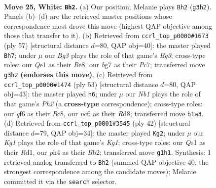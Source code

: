 \documentclass[11pt]{article}
\begin{document}
\clearpage

\begin{figure}[p]\centering
\begin{subfigure}{0.46\textwidth}\centering
\resizebox{\linewidth}{!}{%
\newchessgame
\chessboard[
  setfen={2r3k1/pp3pb1/1nn2qp1/3p4/3P3p/1B4BP/PP3PP1/RN2Q1K1 w - - 0 25},
  showmover=false,
  pgfstyle=straightmove, color=movearrow, markmove={g3-h2}
]}
\caption{}
\end{subfigure}\hfill
\begin{subfigure}{0.46\textwidth}\centering
\resizebox{\linewidth}{!}{%
\newchessgame
\chessboard[
  setfen={4r2k/2pq1pp1/2nb2bp/1p5P/3P4/1B3NN1/1P3PP1/2QR2K1 b - - 0 29},
  showmover=false,
  pgfstyle=straightmove, color=movearrow, markmove={g6-h7}
]}
\caption{}
\end{subfigure}
\\[4pt]
\begin{subfigure}{0.46\textwidth}\centering
\resizebox{\linewidth}{!}{%
\newchessgame
\chessboard[
  setfen={2br2k1/3nbppp/1q2p3/ppN5/3P3P/P3QNP1/1P3P2/2R2BK1 b - - 0 27},
  showmover=false,
  pgfstyle=straightmove, color=movearrow, markmove={h7-h6}
]}
\caption{}
\end{subfigure}\hfill
\begin{subfigure}{0.46\textwidth}\centering
\resizebox{\linewidth}{!}{%
\newchessgame
\chessboard[
  setfen={2r3k1/1p2qpp1/p1n1pnp1/8/2B3P1/bP2PN1P/PB2QP2/3R2K1 w - - 1 22},
  showmover=false,
  pgfstyle=straightmove, color=movearrow, markmove={g1-g2}
]}
\caption{}
\end{subfigure}
\caption{\textbf{Move 25, White: \texttt{Bh2}.} (a) Our position; Melanie plays \texttt{Bh2} (\texttt{g3h2}). Panels (b)--(d) are the retrieved master positions whose correspondence most drove this move (highest QAP objective among those that transfer to it). (b) Retrieved from \texttt{ccrl\_top\_p0000\#1673} (ply 57) [structural distance $d$=80, QAP obj=40]: the master played \texttt{Bh7}; under $\mu$ our \emph{Bg3} plays the role of that game's \emph{Bg3}; cross-type roles: our \emph{Q}e1 as their \emph{R}e8, our \emph{b}g7 as their \emph{P}c7; transferred move \texttt{g3h2} \textbf{(endorses this move)}. (c) Retrieved from \texttt{ccrl\_top\_p0000\#1474} (ply 53) [structural distance $d$=80, QAP obj=43]: the master played \texttt{h6}; under $\mu$ our \emph{Nb1} plays the role of that game's \emph{Ph2} (a \textbf{cross-type} correspondence); cross-type roles: our \emph{q}f6 as their \emph{B}c8, our \emph{n}c6 as their \emph{R}d8; transferred move \texttt{b1a3}. (d) Retrieved from \texttt{ccrl\_top\_p0001\#3545} (ply 42) [structural distance $d$=79, QAP obj=34]: the master played \texttt{Kg2}; under $\mu$ our \emph{Kg1} plays the role of that game's \emph{Kg1}; cross-type roles: our \emph{Q}e1 as their \emph{R}d1, our \emph{p}h4 as their \emph{B}b2; transferred move \texttt{g1h1}. Synthesis: 1 retrieved analog transferred to \texttt{Bh2} (summed QAP objective 40, the strongest correspondence among the candidate moves); Melanie committed it via the \texttt{search} selector.}
\label{fig:thought-m48}
\end{figure}
\end{document}
